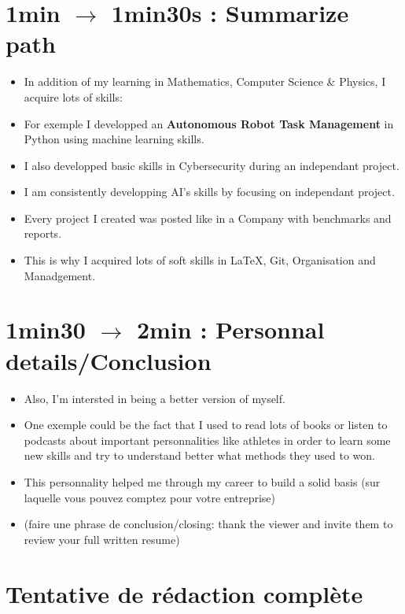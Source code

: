 \documentclass{article}
\begin{document}
\section*{\textbf{1min $\longrightarrow$ 1min30s : Summarize path}}
\begin{itemize}
    \item In addition of my learning in Mathematics, Computer Science \& Physics, I acquire lots of skills:
    \item For exemple I developped an \textbf{Autonomous Robot Task Management} in Python using machine learning skills.
    \item I also developped basic skills in Cybersecurity during an independant project.
    \item I am consistently developping AI's skills by focusing on independant project.
    \item Every project I created was posted like in a Company with benchmarks and reports.
    \item This is why I acquired lots of soft skills in LaTeX, Git, Organisation and Manadgement.
\end{itemize}

\section*{\textbf{1min30 $\longrightarrow$ 2min : Personnal details/Conclusion}}

\begin{itemize}
    \item Also, I'm intersted in being a better version of myself. 
    \item One exemple could be the fact that I used to read lots of books or listen to podcasts about important personnalities like athletes in order to learn some new skills and try to understand better what methods they used to won.
    \item This personnality helped me through my career to build a solid basis (sur laquelle vous pouvez comptez pour votre entreprise) 
    \item (faire une phrase de conclusion/closing: thank the viewer and invite them to review your full written resume)
\end{itemize}


\section*{\textbf{Tentative de rédaction complète}}
\end{document}
